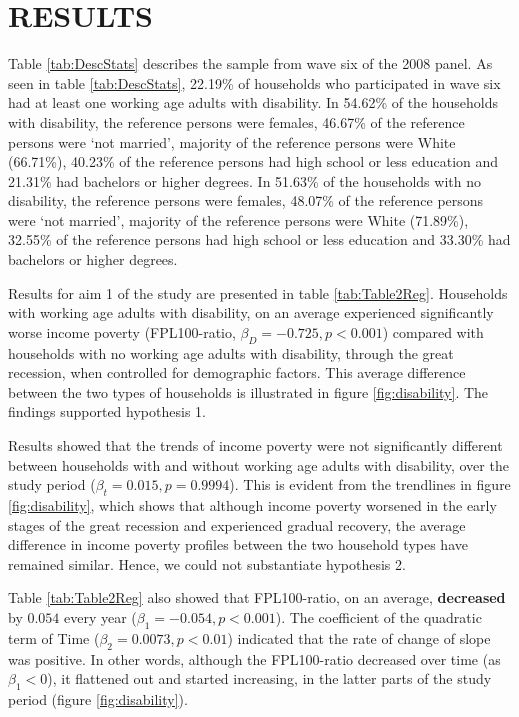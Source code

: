 \documentclass[11pt]{extarticle} %
\begin{document}
\section*{RESULTS}
Table \ref{tab:DescStats} describes the sample from wave six of the 2008 panel. As seen in table \ref{tab:DescStats}, 22.19\% of households who participated in wave six had at least one working age adults with disability. In 54.62\% of the households with disability, the reference persons were females, 46.67\% of the reference persons were `not married', majority of the reference persons were White (66.71\%), 40.23\% of the reference persons had high school or less education and 21.31\% had bachelors or higher degrees. In 51.63\% of the households with no disability, the reference persons were females, 48.07\% of the reference persons were `not married', majority of the reference persons were White (71.89\%), 32.55\% of the reference persons had high school or less education and 33.30\% had bachelors or higher degrees.

Results for aim 1 of the study are presented in table \ref{tab:Table2Reg}. Households with working age adults with disability, on an average experienced significantly worse income poverty (FPL100-ratio, $\beta_D = -0.725, p < 0.001$) compared with households with no working age adults with disability, through the great recession, when controlled for demographic factors. This average difference between the two types of households is illustrated in figure \ref{fig:disability}. The findings supported hypothesis 1. 

Results showed that the trends of income poverty were not significantly different between households with and without working age adults with disability, over the study period ($\beta_t = 0.015, p = 0.9994$). This is evident from the trendlines in figure \ref{fig:disability}, which shows that although income poverty worsened in the early stages of the great recession and experienced gradual recovery, the average difference in income poverty profiles between the two household types have remained similar. Hence, we could not substantiate hypothesis 2. 

Table \ref{tab:Table2Reg} also showed that FPL100-ratio, on an average, {\bf{decreased}} by $0.054$ every year ($\beta_1 = -0.054, p < 0.001$). The coefficient of the quadratic term of Time ($\beta_2 = 0.0073, p < 0.01$) indicated that the rate of change of slope was positive. In other words, although the FPL100-ratio decreased over time (as $\beta_1 < 0$), it flattened out and started increasing, in the latter parts of the study period (figure \ref{fig:disability}). 
\end{document}
